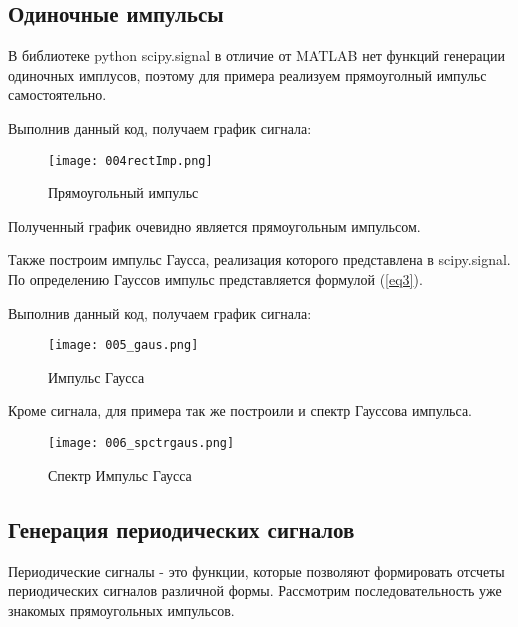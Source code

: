 \subsection{Одиночные импульсы}

В библиотеке python scipy.signal в отличие от MATLAB нет функций генерации одиночных имплусов, поэтому для примера реализуем прямоуголный импульс самостоятельно.  

\parindent=1cm %
\noindent  Выполнив данный код, получаем график сигнала:
\begin{figure}[H]
	\begin{center}
		\texttt{[image: 004rectImp.png]}
		\caption{Прямоугольный импульс} 
		\label{pic:pic04} %
	\end{center}
\end{figure}
Полученный график очевидно является прямоугольным импульсом. 

Также построим импульс Гаусса, реализация которого представлена в scipy.signal. По определению Гауссов импульс представляется формулой (\ref{eq3}).


\parindent=1cm %
\noindent  Выполнив данный код, получаем график сигнала:
\begin{figure}[H]
	\begin{center}
		\texttt{[image: 005\_gaus.png]}
		\caption{Импульс Гаусса} 
		\label{pic:pic05} %
	\end{center}
\end{figure}

Кроме сигнала, для примера так же построили и спектр Гауссова импульса.
\begin{figure}[H]
	\begin{center}
		\texttt{[image: 006\_spctrgaus.png]}
		\caption{Спектр Импульс Гаусса} 
		\label{pic:pic06} %
	\end{center}
\end{figure}

\subsection{Генерация периодических сигналов}
Периодические сигналы - это функции, которые позволяют формировать отсчеты периодических сигналов различной формы. Рассмотрим последовательность уже знакомых прямоугольных импульсов.

